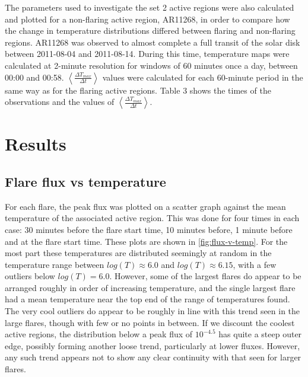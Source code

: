 \documentclass{article}
\begin{document}
The parameters used to investigate the set 2 active regions were also
calculated and plotted for a non-flaring active region, AR11268, in
order to compare how the change in temperature distributions differed
between flaring and non-flaring regions. AR11268 was observed to almost
complete a full transit of the solar disk between 2011-08-04 and 2011-08-14.
During this time, temperature maps were calculated at 2-minute resolution
for windows of 60 minutes once a day, between 00:00 and 00:58. $\left\langle \frac{\Delta T_{max}}{\Delta t}\right\rangle $
values were calculated for each 60-minute period in the same way as
for the flaring active regions. Table 3 shows the times of the observations
and the values of $\left\langle \frac{\Delta T_{max}}{\Delta t}\right\rangle $.


\section{Results}

\subsection{Flare flux vs temperature }
For each flare, the peak flux was plotted on a scatter graph against
the mean temperature of the associated active region. This was done
for four times in each case: 30 minutes before the flare start time,
10 minutes before, 1 minute before and at the flare start time. These
plots are shown in \ref{fig:flux-v-temp}. For the most part these
temperatures are distributed seemingly at random in the temperature
range between $log(T)\approx6.0$ and $log(T)\approx6.15$, with a
few outliers below $log(T)=6.0$. However, some of the largest flares
do appear to be arranged roughly in order of increasing temperature,
and the single largest flare had a mean temperature near the top end
of the range of temperatures found. The very cool outliers do appear
to be roughly in line with this trend seen in the large flares, though
with few or no points in between. If we discount the coolest active
regions, the distribution below a peak flux of $10^{-4.5}$ has quite
a steep outer edge, possibly forming another loose trend, particularly
at lower fluxes. However, any such trend appears not to show any clear
continuity with that seen for larger flares.
\end{document}
